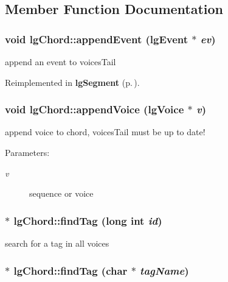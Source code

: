 \subsection{Member Function Documentation}
\subsubsection{\setlength{\rightskip}{0pt plus 5cm}void lg\-Chord::append\-Event ({\bf lg\-Event} $\ast$ {\em ev})\hspace{0.3cm}{\tt  [virtual]}}\label{classlgChord_a3}


append an event to voices\-Tail 



Reimplemented in {\bf lg\-Segment} {\rm (p.\,\pageref{classlgSegment_a6})}.
\subsubsection{\setlength{\rightskip}{0pt plus 5cm}void lg\-Chord::append\-Voice ({\bf lg\-Voice} $\ast$ {\em v})}\label{classlgChord_a4}


append voice to chord, voices\-Tail must be up to date! \begin{Desc}
\item[Parameters: ]\par
\begin{description}
\item[{\em 
v}]sequence or voice \end{description}
\end{Desc}
\subsubsection{ $\ast$ lg\-Chord::find\-Tag (long int {\em id})\hspace{0.3cm}{\tt  [virtual]}}\label{classlgChord_a9}


search for a tag in all voices 

\subsubsection{ $\ast$ lg\-Chord::find\-Tag (char $\ast$ {\em tag\-Name})}\label{classlgChord_a8}


